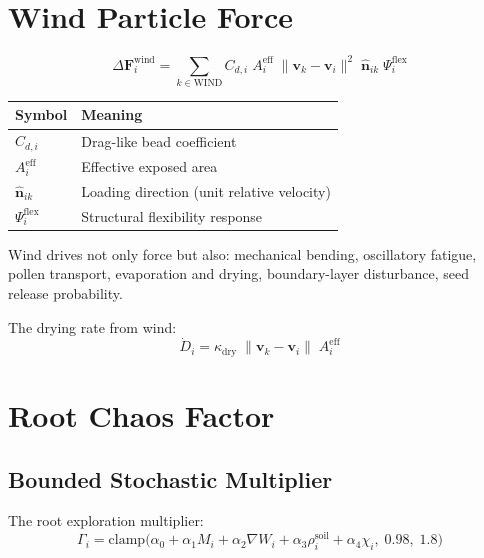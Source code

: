 \documentclass[11pt]{article}
\begin{document}
\section{Wind Particle Force}

\begin{equation}
  \Delta\mathbf{F}_i^{\mathrm{wind}} = \sum_{k \in \mathrm{WIND}}
    C_{d,i}\;A_i^{\mathrm{eff}}\;\|\mathbf{v}_k - \mathbf{v}_i\|^2\;
    \hat{\mathbf{n}}_{ik}\;\Psi_i^{\mathrm{flex}}
  \label{eq:wind}
\end{equation}

\begin{center}
\begin{tabular}{ll}
\toprule
\textbf{Symbol} & \textbf{Meaning} \\
\midrule
$C_{d,i}$ & Drag-like bead coefficient \\
$A_i^{\mathrm{eff}}$ & Effective exposed area \\
$\hat{\mathbf{n}}_{ik}$ & Loading direction (unit relative velocity) \\
$\Psi_i^{\mathrm{flex}}$ & Structural flexibility response \\
\bottomrule
\end{tabular}
\end{center}

Wind drives not only force but also:
mechanical bending, oscillatory fatigue, pollen transport, evaporation
and drying, boundary-layer disturbance, seed release probability.

The drying rate from wind:
\begin{equation}
  \dot{D}_i = \kappa_{\mathrm{dry}}\;\|\mathbf{v}_k - \mathbf{v}_i\|\;A_i^{\mathrm{eff}}
\end{equation}

\section{Root Chaos Factor}

\subsection{Bounded Stochastic Multiplier}

The root exploration multiplier:
\begin{equation}
  \Gamma_i = \mathrm{clamp}\!\bigl(
    \alpha_0 + \alpha_1 M_i + \alpha_2 \nabla W_i
    + \alpha_3 \rho_i^{\mathrm{soil}} + \alpha_4 \chi_i,
    \;0.98,\;1.8
  \bigr)
  \label{eq:gamma}
\end{equation}
\end{document}
